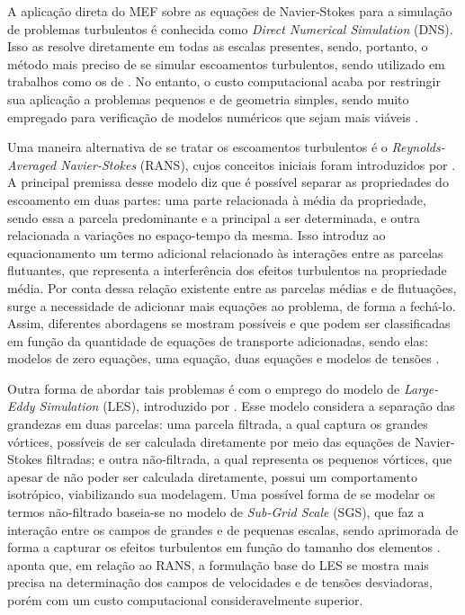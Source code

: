 A aplicação direta do MEF sobre as equações de Navier-Stokes para a simulação de problemas turbulentos é conhecida como \textit{Direct Numerical Simulation} (DNS). Isso as resolve diretamente em todas as escalas presentes, sendo, portanto, o método mais preciso de se simular escoamentos turbulentos, sendo utilizado em trabalhos como os de . No entanto, o custo computacional acaba por restringir sua aplicação a problemas pequenos e de geometria simples, sendo muito empregado para verificação de modelos numéricos que sejam mais viáveis \cite{piomelli1999large,yokokawa200216}.

Uma maneira alternativa de se tratar os escoamentos turbulentos é o \textit{Reynolds-Averaged Navier-Stokes} (RANS), cujos conceitos iniciais foram introduzidos por . A principal premissa desse modelo diz que é possível separar as propriedades do escoamento em duas partes: uma parte relacionada à média da propriedade, sendo essa a parcela predominante e a principal a ser determinada, e outra relacionada a variações no espaço-tempo da mesma. Isso introduz ao equacionamento um termo adicional relacionado às interações entre as parcelas flutuantes, que representa a interferência dos efeitos turbulentos na propriedade média. Por conta dessa relação existente entre as parcelas médias e de flutuações, surge a necessidade de adicionar mais equações ao problema, de forma a fechá-lo. Assim, diferentes abordagens se mostram possíveis e que podem ser classificadas em função da quantidade de equações de transporte adicionadas, sendo elas: modelos de zero equações, uma equação, duas equações e modelos de tensões \cite{piomelli1999large,alfonsi2009reynolds,bazilevs2010large,ling2015evaluation}.

Outra forma de abordar tais problemas é com o emprego do modelo de \textit{Large-Eddy Simulation} (LES), introduzido por . Esse modelo considera a separação das grandezas em duas parcelas: uma parcela filtrada, a qual captura os grandes vórtices, possíveis de ser calculada diretamente por meio das equações de Navier-Stokes filtradas; e outra não-filtrada, a qual representa os pequenos vórtices, que apesar de não poder ser calculada diretamente, possui um comportamento isotrópico, viabilizando sua modelagem. Uma possível forma de se modelar os termos não-filtrado baseia-se no modelo de \textit{Sub-Grid Scale} (SGS), que faz a interação entre os campos de grandes e de pequenas escalas, sendo aprimorada de forma a capturar os efeitos turbulentos em função do tamanho dos elementos \cite{ghosal1995basic,hughes2000large,moeng2015large}.  aponta que, em relação ao RANS, a formulação base do LES se mostra mais precisa na determinação dos campos de velocidades e de tensões desviadoras, porém com um custo computacional consideravelmente superior.

